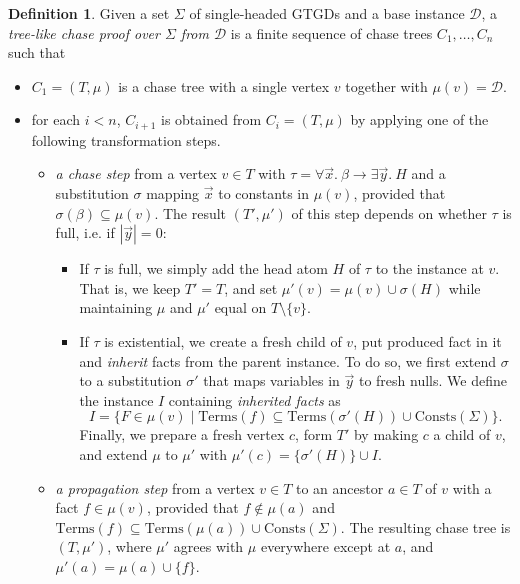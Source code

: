 \documentclass[12pt]{report}
\theoremstyle{plain}
\theoremstyle{definition}
\newtheorem{definition}[theorem]{Definition}
\def\Consts{{\mathrm{Consts}}}
\def\Terms{{\mathrm{Terms}}}
\begin{document}
\begin{definition}
\label{tree-like-chase-proof}
  Given a set $\Sigma$ of single-headed GTGDs and a base instance $\mathcal{D}$, a \emph{tree-like chase proof over $\Sigma$ from $\mathcal{D}$} is a finite sequence of chase trees $C_1, \ldots, C_n$ such that
  \begin{itemize}
    \item $C_1 = (T, \mu)$ is a chase tree with a single vertex $v$ together with $\mu(v) = \mathcal{D}$.
    \item for each $i < n$, $C_{i + 1}$ is obtained from $C_i = (T, \mu)$ by applying one of the following transformation steps.
    \begin{itemize}
      \item \emph{a chase step} from a vertex $v \in T$ with $\tau = \forall \vec{x}.\ \beta \rightarrow \exists \vec{y}.\ H$ and a substitution $\sigma$ mapping $\vec{x}$ to constants in $\mu(v)$, provided that $\sigma(\beta) \subseteq \mu(v)$. The result $(T', \mu')$ of this step depends on whether $\tau$ is full, i.e. if $|\vec{y}| = 0$:
      \begin{itemize}
        \item If $\tau$ is full, we simply add the head atom $H$ of $\tau$ to the instance at $v$. That is, we keep $T' = T$, and set $\mu'(v) = \mu(v) \cup \sigma(H)$ while maintaining $\mu$ and $\mu'$ equal on $T \setminus \{v\}$.
        \item If $\tau$ is existential, we create a fresh child of $v$, put produced fact in it and \emph{inherit} facts from the parent instance. To do so, we first extend $\sigma$ to a substitution $\sigma'$ that maps variables in $\vec{y}$ to fresh nulls. We define the instance $I$ containing \emph{inherited facts} as $$I = \{ F \in \mu(v) \mid \Terms(f) \subseteq \Terms(\sigma'(H)) \cup \Consts(\Sigma) \}.$$ Finally, we prepare a fresh vertex $c$, form $T'$ by making $c$ a child of $v$, and extend $\mu$ to $\mu'$ with $\mu'(c) = \{\sigma'(H)\} \cup I$.
      \end{itemize}
      \item \emph{a propagation step} from a vertex $v \in T$ to an ancestor $a \in T$ of $v$ with a fact $f \in \mu(v)$, provided that $f \not\in \mu(a)$ and $\Terms(f) \subseteq \Terms(\mu(a)) \cup \Consts(\Sigma)$. The resulting chase tree is $(T, \mu')$, where $\mu'$ agrees with $\mu$ everywhere except at $a$, and $\mu'(a) = \mu(a) \cup \{f\}$.
    \end{itemize}
  \end{itemize}
\end{definition}
\end{document}
